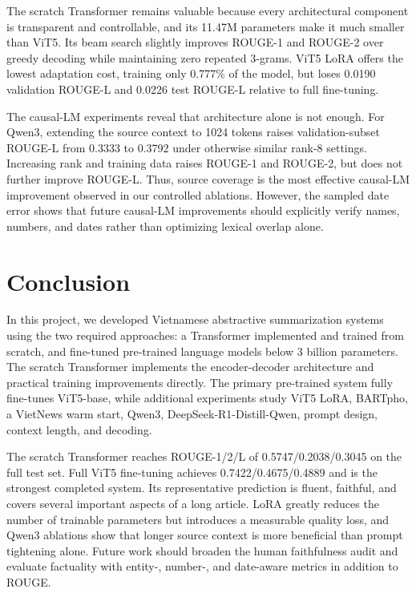 \documentclass[conference]{IEEEtran}
\begin{document}
The scratch Transformer remains valuable because every architectural component is transparent and controllable, and its 11.47M parameters make it much smaller than ViT5. Its beam search slightly improves ROUGE-1 and ROUGE-2 over greedy decoding while maintaining zero repeated 3-grams. ViT5 LoRA offers the lowest adaptation cost, training only 0.777\% of the model, but loses 0.0190 validation ROUGE-L and 0.0226 test ROUGE-L relative to full fine-tuning.

The causal-LM experiments reveal that architecture alone is not enough. For Qwen3, extending the source context to 1024 tokens raises validation-subset ROUGE-L from 0.3333 to 0.3792 under otherwise similar rank-8 settings. Increasing rank and training data raises ROUGE-1 and ROUGE-2, but does not further improve ROUGE-L. Thus, source coverage is the most effective causal-LM improvement observed in our controlled ablations. However, the sampled date error shows that future causal-LM improvements should explicitly verify names, numbers, and dates rather than optimizing lexical overlap alone.

\section{Conclusion}
In this project, we developed Vietnamese abstractive summarization systems using the two required approaches: a Transformer implemented and trained from scratch, and fine-tuned pre-trained language models below 3 billion parameters. The scratch Transformer implements the encoder-decoder architecture and practical training improvements directly. The primary pre-trained system fully fine-tunes ViT5-base, while additional experiments study ViT5 LoRA, BARTpho, a VietNews warm start, Qwen3, DeepSeek-R1-Distill-Qwen, prompt design, context length, and decoding.

The scratch Transformer reaches ROUGE-1/2/L of 0.5747/0.2038/0.3045 on the full test set. Full ViT5 fine-tuning achieves 0.7422/0.4675/0.4889 and is the strongest completed system. Its representative prediction is fluent, faithful, and covers several important aspects of a long article. LoRA greatly reduces the number of trainable parameters but introduces a measurable quality loss, and Qwen3 ablations show that longer source context is more beneficial than prompt tightening alone. Future work should broaden the human faithfulness audit and evaluate factuality with entity-, number-, and date-aware metrics in addition to ROUGE.
\end{document}
